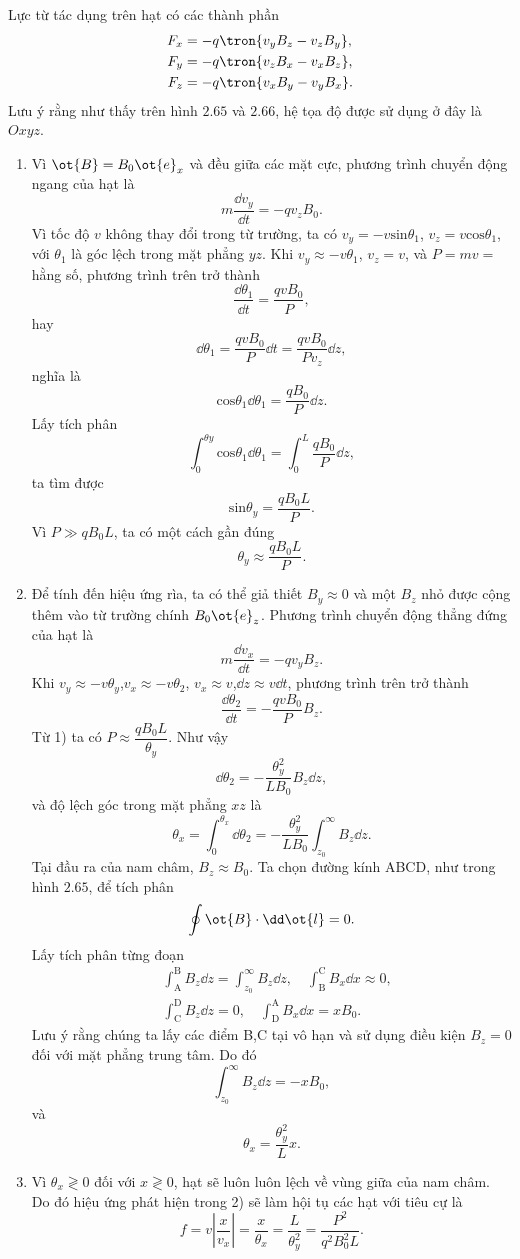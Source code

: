 \begin{loigiai}
Lực từ tác dụng trên hạt có các thành phần
\begin{align*}
    F_x&=-q\tron{v_yB_z-v_zB_y},\\
    F_y&=-q\tron{v_zB_x-v_xB_z},\\
    F_z&=-q\tron{v_xB_y-v_yB_x}.
\end{align*}
Lưu ý rằng như thấy trên hình $2.65$ và $2.66$, hệ tọa độ được sử dụng ở đây là $Oxyz$.
\begin{enumerate}[1)]

\item Vì $\ot{B}=B_0\ot{e}_x$ và đều giữa các mặt cực, phương trình chuyển động ngang của hạt là
$$m\dfrac{\dd v_y}{\dd t}=-qv_zB_0.$$
Vì tốc độ $v$ không thay đổi trong từ trường, ta có $v_y=-v\mathrm{sin}\theta_1$, $v_z=v\mathrm{cos}\theta_1$, với $\theta_1$ là góc lệch trong mặt phẳng $yz$. Khi $v_y\approx-v\theta_1$, $v_z=v$, và $P=mv=$ hằng số, phương trình trên trở thành
$$\dfrac{\dd \theta_1}{\dd t}=\dfrac{qvB_0}{P},$$
hay
$$\dd\theta_1=\dfrac{qvB_0}{P}\dd t=\dfrac{qvB_0}{Pv_z}\dd z,$$
nghĩa là
$$\mathrm{cos}\theta_1\dd \theta_1=\dfrac{qB_0}{P}\dd z.$$
Lấy tích phân
$$
\int_{0}^{\theta y} \mathrm{cos} \theta_{1} \dd \theta_{1}=\int_{0}^{L} \dfrac{q B_{0}}{P} \dd z,
$$
ta tìm được
$$\mathrm{sin}\theta_y=\dfrac{qB_0L}{P}.$$
Vì $P\gg qB_0L$, ta có một cách gần đúng
$$\theta_y\approx\dfrac{qB_0L}{P}.$$
\item Để tính đến hiệu ứng rìa, ta có thể giả thiết $B_y\approx0$ và một $B_z$ nhỏ được cộng thêm vào từ trường chính $B_0\ot{e}_z$. Phương trình chuyển động thẳng đứng của hạt là
$$m\dfrac{\dd v_x}{\dd t}=-qv_yB_z.$$
Khi $v_y\approx-v\theta_y$,$v_x\approx-v\theta_2$, $v_x\approx v$,$\dd z\approx v\dd t$, phương trình trên trở thành
$$\dfrac{\dd \theta_2}{\dd t}=-\dfrac{qvB_0}{P}B_z.$$
Từ 1) ta có $P\approx\dfrac{qB_0L}{\theta_y}$. Như vậy
$$\dd \theta_2=-\dfrac{\theta_y^2}{LB_0}B_z\dd z,$$
và độ lệch góc trong mặt phẳng $xz$ là
$$\theta_x=\int_0^{\theta_x}\dd\theta_2=-\dfrac{\theta_y^2}{LB_0}\int_{z_0}^\infty B_z\dd z.$$
Tại đầu ra của nam châm, $B_z\approx B_0$. Ta chọn đường kính ABCD, như trong hình $2.65$, để tích phân
$$
\oint \ot{B} \cdot \dd \ot{l}=0.
$$
Lấy tích phân từng đoạn
$$
\begin{aligned}
&\int_{\mathrm{A}}^{\mathrm{B}} B_{z} \dd z=\int_{z_{0}}^{\infty} B_{z} \dd z, \quad \int_{\mathrm{B}}^{\mathrm{C}} B_{x} \dd x \approx 0, \\
&\int_{\mathrm{C}}^{\mathrm{D}} B_{z} \dd z=0, \quad \int_{\mathrm{D}}^{\mathrm{A}} B_{x} \dd x=x B_{0} .
\end{aligned}
$$
Lưu ý rằng chúng ta lấy các điểm B,C tại vô hạn và sử dụng điều kiện $B_z=0$ đối với mặt phẳng trung tâm. Do đó
$$\int_{z_0}^\infty B_z\dd z=-xB_0,$$
và
$$\theta_x=\dfrac{\theta_y^2}{L}x.$$
\item Vì $\theta_{x} \gtrless 0$ đối với $x \gtrless 0$, hạt sẽ luôn luôn lệch về vùng giữa của nam châm. Do đó hiệu ứng phát hiện trong 2) sẽ làm hội tụ các hạt với tiêu cự là
$$
f=v\left|\dfrac{x}{v_{x}}\right|=\dfrac{x}{\theta_{x}}=\dfrac{L}{\theta_{y}^{2}}=\dfrac{P^{2}}{q^{2} B_{0}^{2} L}.
$$
\end{enumerate}
\end{loigiai}


